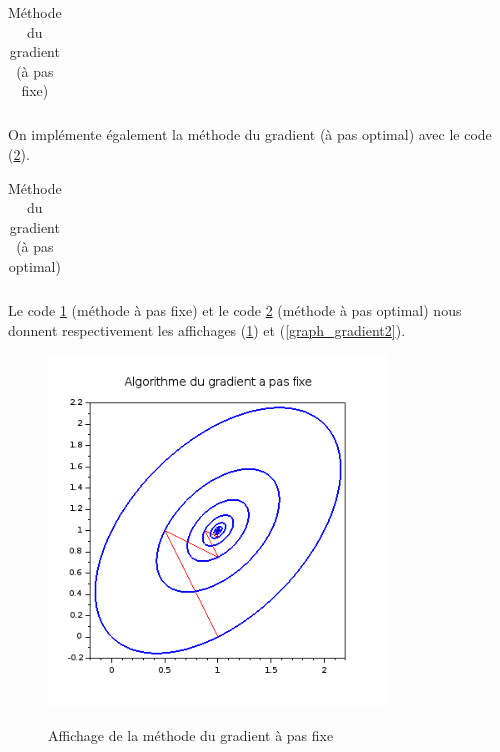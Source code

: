 \documentclass[a4paper,10pt]{report}
\begin{document}
\begin{table}[H]
\caption{Méthode du gradient (à pas fixe)}
\begin{tabular}{l}

\label{gradient}
\end{tabular}
\end{table}

\newpage
On implémente également la méthode du gradient (à pas optimal) avec le code (\ref{gradient_opt}).\\

\begin{table}[H]
\caption{Méthode du gradient (à pas optimal)}
\begin{tabular}{l}

\label{gradient_opt}
\end{tabular}
\end{table}

\newpage
Le code \ref{gradient} (méthode à pas fixe) et le code \ref{gradient_opt} (méthode à pas optimal) nous donnent respectivement les affichages (\ref{graph_gradient}) et (\ref{graph_gradient2}).
\begin{figure}[H]
\centering
\caption{Affichage de la méthode du gradient à pas fixe}
\includegraphics[width=9cm]{gradient.png}
\label{graph_gradient}
\end{figure}
\end{document}
